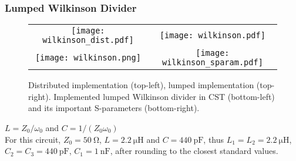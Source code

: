 \begin{frame}
	\frametitle{Lumped Wilkinson Divider}
	\begin{figure}
		\centering
		\begin{tabular}{cc}
			\texttt{[image: wilkinson\_dist.pdf]}&
			\texttt{[image: wilkinson.pdf]}\\
			\texttt{[image: wilkinson.png]}&
			\texttt{[image: wilkinson\_sparam.pdf]}
		\end{tabular}
		\caption{Distributed implementation (top-left), lumped implementation (top-right). Implemented lumped Wilkinson divider in CST (bottom-left) and its important S-parameters (bottom-right).}
	\end{figure}
	\vspace{-20pt}
	$L = Z_0/\omega_0$ and $C = 1/(Z_0\omega_0)$\cite{9422969}\\
	For this circuit, $Z_0 = \SI{50}{\ohm}$, $L = \SI{2.2}{\micro\henry}$ and $C = \SI{440}{\pico\farad}$, thus $L_1 = L_2 =  \SI{2.2}{\micro\henry}$, $C_2 = C_3 = \SI{440}{\pico\farad}$, $C_1 = \SI{1}{\nano\farad}$, after rounding to the closest standard values.
\end{frame}

